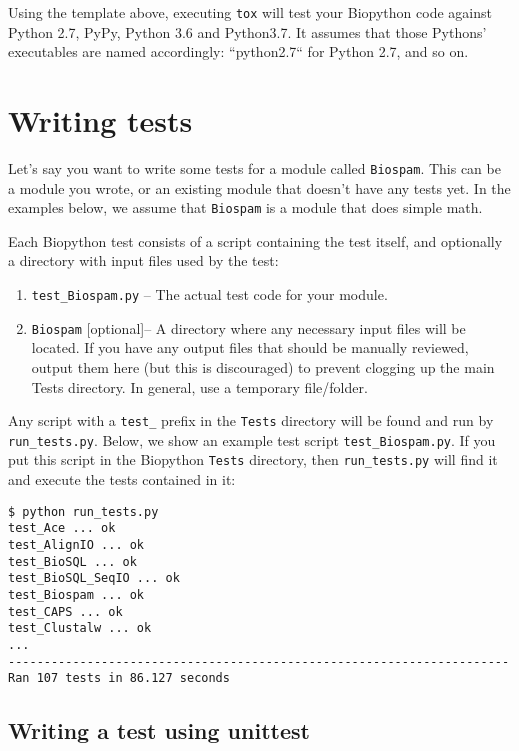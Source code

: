Using the template above, executing \texttt{tox} will test your Biopython code against
Python 2.7, PyPy, Python 3.6 and Python3.7. It assumes that those
Pythons' executables are named accordingly: ``python2.7`` for Python 2.7, and so on.


\section{Writing tests}

Let's say you want to write some tests for a module called \verb|Biospam|.
This can be a module you wrote, or an existing module that doesn't have
any tests yet.  In the examples below, we assume that
\verb|Biospam| is a module that does simple math.

Each Biopython test consists of a script containing the test itself, and
optionally a directory with input files used by the test:

\begin{enumerate}
  \item \verb|test_Biospam.py| -- The actual test code for your module.
  \item \verb|Biospam| [optional]-- A directory where any necessary input files
    will be located. If you have any output files that should be manually
    reviewed, output them here (but this is discouraged) to prevent clogging
    up the main Tests directory. In general, use a temporary file/folder.
\end{enumerate}

Any script with a \verb|test_| prefix in the \verb|Tests| directory will be found and run by \verb|run_tests.py|. Below, we show an example test script \verb|test_Biospam.py|. If you put this script in the Biopython \verb|Tests| directory, then \verb|run_tests.py| will find it and execute the tests contained in it:

\begin{verbatim}
$ python run_tests.py
test_Ace ... ok
test_AlignIO ... ok
test_BioSQL ... ok
test_BioSQL_SeqIO ... ok
test_Biospam ... ok
test_CAPS ... ok
test_Clustalw ... ok
...
----------------------------------------------------------------------
Ran 107 tests in 86.127 seconds
\end{verbatim}

\subsection{Writing a test using unittest}

